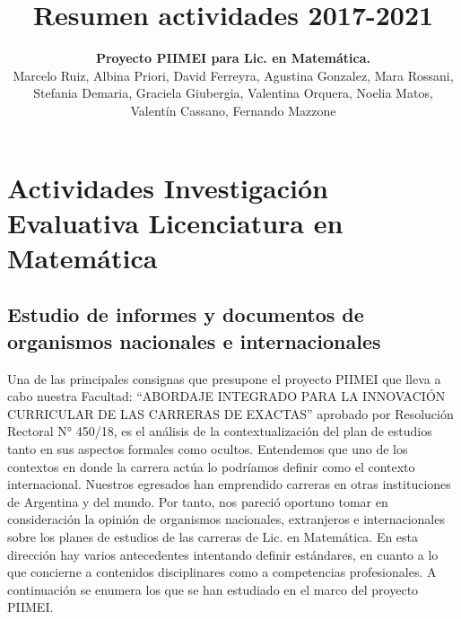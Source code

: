 \documentclass[a4paper,10pt,BCOR10mm,oneside,headsepline]{scrbook}
\title{Resumen actividades 2017-2021}
\author{\textbf{Proyecto PIIMEI para Lic. en Matemática.}\\
Marcelo Ruiz,
Albina Priori,
David Ferreyra,
Agustina Gonzalez,
Mara Rossani,\\
Stefania Demaria,
Graciela Giubergia,
Valentina Orquera,
Noelia Matos,\\
Valentín Cassano,
Fernando Mazzone}
\date{}
\begin{document}

\maketitle
\normalfont
\tableofcontents

\chapter{Actividades Investigación Evaluativa Licenciatura en Matemática}

\section{Estudio de informes y documentos de organismos nacionales e internacionales}
Una de las principales consignas que presupone el proyecto PIIMEI que lleva a cabo nuestra Facultad: “ABORDAJE INTEGRADO PARA LA INNOVACIÓN CURRICULAR DE LAS CARRERAS DE EXACTAS” aprobado por Resolución Rectoral N° 450/18, es el análisis de la contextualización del plan de estudios tanto en sus aspectos formales como ocultos. Entendemos que uno de los contextos en donde la carrera actúa lo podríamos definir como el contexto internacional. Nuestros egresados han emprendido carreras en otras instituciones de Argentina y del mundo. Por tanto, nos pareció oportuno tomar en consideración la opinión de organismos nacionales, extranjeros e internacionales sobre los planes de estudios de las carreras de Lic. en Matemática. En esta dirección hay varios antecedentes intentando definir estándares, en cuanto a lo que concierne a contenidos disciplinares como a competencias profesionales. A continuación se enumera los que se han estudiado en el marco del proyecto PIIMEI.
\end{document}

